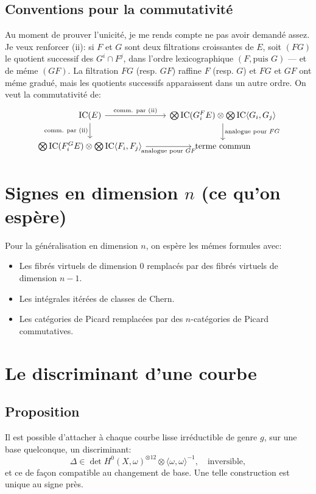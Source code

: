 \documentclass[11pt,a4paper]{article}
\theoremstyle{plain}
\theoremstyle{definition}
\newcommand{\IC}{\mathrm{IC}}
\begin{document}
\subsection{Conventions pour la commutativit\'e}
Au moment de prouver l'unicit\'e, je me rends compte ne pas avoir demand\'e assez. Je veux renforcer (ii): si $F$ et $G$ sont deux filtrations croissantes de $E$, soit $(FG)$ le quotient successif des $G^i \cap F^j$, dans l'ordre lexicographique $(F, \text{puis } G)$ --- et de m\'eme $(GF)$. La filtration $FG$ (resp. $GF$) raffine $F$ (resp. $G$) et $FG$ et $GF$ ont m\'eme gradu\'e, mais les quotients successifs apparaissent dans un autre ordre. On veut la commutativit\'e de:
\begin{equation}
\begin{tikzcd}
\IC(E) \arrow[r, "\text{comm. par (ii)}"] \arrow[d, "\text{comm. par (ii)}"'] & \bigotimes \IC(G_i^F E) \otimes \bigotimes \IC\langle G_i, G_j \rangle \arrow[d, "\text{analogue pour } FG"] \\
\bigotimes \IC(F_i^G E) \otimes \bigotimes \IC\langle F_i, F_j \rangle \arrow[r, "\text{analogue pour } GF"'] & \text{terme commun}
\end{tikzcd}
\end{equation}

\section{Signes en dimension $n$ (ce qu'on esp\`ere)}

Pour la g\'en\'eralisation en dimension $n$, on esp\`ere les m\'emes formules avec:
\begin{itemize}
\item Les fibr\'es virtuels de dimension 0 remplac\'es par des fibr\'es virtuels de dimension $n-1$.
\item Les int\'egrales it\'er\'ees de classes de Chern.
\item Les cat\'egories de Picard remplac\'ees par des $n$-cat\'egories de Picard commutatives.
\end{itemize}

\section{Le discriminant d'une courbe}

\subsection{Proposition}
Il est possible d'attacher \`a chaque courbe lisse irr\'eductible de genre $g$, sur une base quelconque, un discriminant:
\begin{equation}
\Delta \in \det H^0(X, \omega)^{\otimes 12} \otimes \langle \omega, \omega \rangle^{-1}, \quad \text{inversible},
\end{equation}
et ce de fa\c{c}on compatible au changement de base. Une telle construction est unique au signe pr\`es.
\end{document}
